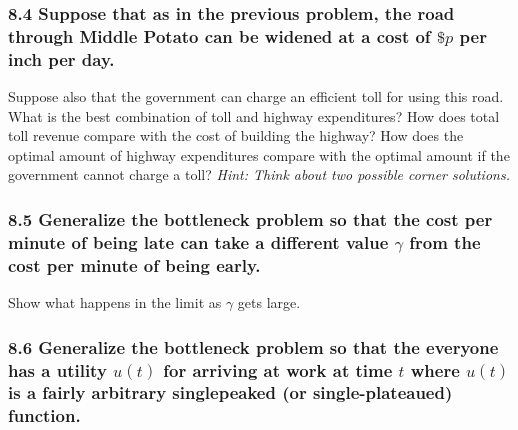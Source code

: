 \documentclass[]{article}
\begin{document}
\subsubsection{\texorpdfstring{8.4 Suppose that as in the previous
problem, the road through Middle Potato can be widened at a cost of
\(\$p\) per inch per
day.}{8.4 Suppose that as in the previous problem, the road through Middle Potato can be widened at a cost of \textbackslash{}\$p per inch per day.}}\label{suppose-that-as-in-the-previous-problem-the-road-through-middle-potato-can-be-widened-at-a-cost-of-p-per-inch-per-day.}

Suppose also that the government can charge an efficient toll for using
this road. What is the best combination of toll and highway
expenditures? How does total toll revenue compare with the cost of
building the highway? How does the optimal amount of highway
expenditures compare with the optimal amount if the government cannot
charge a toll? \emph{Hint: Think about two possible corner solutions.}

\subsubsection{\texorpdfstring{8.5 Generalize the bottleneck problem so
that the cost per minute of being late can take a different value
\(\gamma\) from the cost per minute of being
early.}{8.5 Generalize the bottleneck problem so that the cost per minute of being late can take a different value \textbackslash{}gamma from the cost per minute of being early.}}\label{generalize-the-bottleneck-problem-so-that-the-cost-per-minute-of-being-late-can-take-a-different-value-gamma-from-the-cost-per-minute-of-being-early.}

Show what happens in the limit as \(\gamma\) gets large.

\subsubsection{\texorpdfstring{8.6 Generalize the bottleneck problem so
that the everyone has a utility \(u(t)\) for arriving at work at time
\(t\) where \(u(t)\) is a fairly arbitrary singlepeaked (or
single-plateaued)
function.}{8.6 Generalize the bottleneck problem so that the everyone has a utility u(t) for arriving at work at time t where u(t) is a fairly arbitrary singlepeaked (or single-plateaued) function.}}\label{generalize-the-bottleneck-problem-so-that-the-everyone-has-a-utility-ut-for-arriving-at-work-at-time-t-where-ut-is-a-fairly-arbitrary-singlepeaked-or-single-plateaued-function.}
\end{document}
